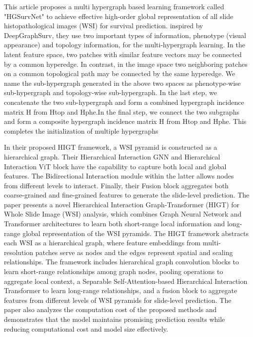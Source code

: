 \documentclass[journal,twoside,web]{ieeecolor}
\begin{document}
This article proposes a multi hypergraph based learning framework called "HGSurvNet" \cite{di2022generating}to achieve effective high-order global representation of all slide histopathological images (WSI) for survival prediction. inspired by DeepGraphSurv, they use two important types of information, phenotype (visual appearance) and topology information, for the multi-hypergraph learning. In the latent feature space, two patches with similar feature vectors may be connected by a common hyperedge. In contrast, in the image space two neighboring patches on a common topological path may be connected by the same hyperedge. We name the sub-hypergraph generated in the above two spaces as phenotype-wise sub-hypergraph and topology-wise sub-hypergraph. In the last step, we concatenate the two sub-hypergraph and form a combined hypergraph incidence matrix H from Htop and Hphe.In the final step, we connect the two subgraphs and form a composite hypergraph incidence matrix H from Htop and Hphe. This completes the initialization of multiple hypergraphs





In their proposed HIGT framework\cite{guo2023higt}, a WSI pyramid is constructed as a hierarchical graph. Their Hierarchical Interaction GNN and Hierarchical Interaction ViT block have the capability to capture both local and global features. The Bidirectional Interaction module within the latter allows nodes from different levels to interact. Finally, their Fusion block aggregates both coarse-grained and fine-grained features to generate the slide-level prediction.
The paper presents a novel Hierarchical Interaction Graph-Transformer (HIGT) for Whole Slide Image (WSI) analysis, which combines Graph Neural Network and Transformer architectures to learn both short-range local information and long-range global representation of the WSI pyramids.
The HIGT framework abstracts each WSI as a hierarchical graph, where feature embeddings from multi-resolution patches serve as nodes and the edges represent spatial and scaling relationships.
The framework includes hierarchical graph convolution blocks to learn short-range relationships among graph nodes, pooling operations to aggregate local context, a Separable Self-Attention-based Hierarchical Interaction Transformer to learn long-range relationships, and a fusion block to aggregate features from different levels of WSI pyramids for slide-level prediction.
The paper also analyzes the computation cost of the proposed methods and demonstrates that the model maintains promising prediction results while reducing computational cost and model size effectively.
\end{document}
